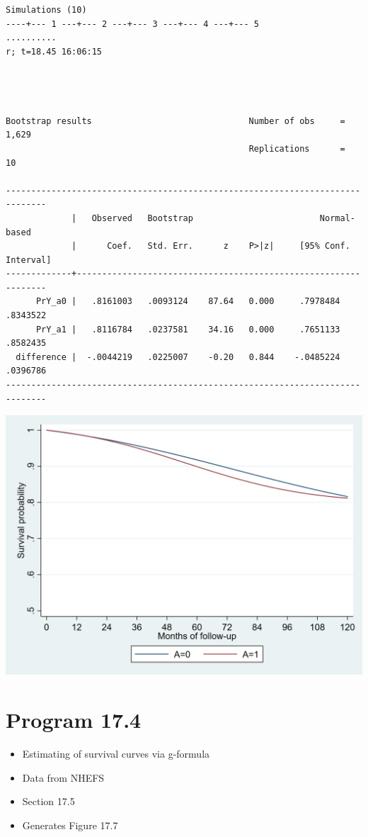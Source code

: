 \documentclass[
  10pt,
]{book}
\providecommand{\tightlist}{%
  \setlength{\itemsep}{0pt}\setlength{\parskip}{0pt}}
\begin{document}
\begin{verbatim}
Simulations (10)
----+--- 1 ---+--- 2 ---+--- 3 ---+--- 4 ---+--- 5 
..........
r; t=18.45 16:06:15




Bootstrap results                               Number of obs     =      1,629
                                                Replications      =         10

------------------------------------------------------------------------------
             |   Observed   Bootstrap                         Normal-based
             |      Coef.   Std. Err.      z    P>|z|     [95% Conf. Interval]
-------------+----------------------------------------------------------------
      PrY_a0 |   .8161003   .0093124    87.64   0.000     .7978484    .8343522
      PrY_a1 |   .8116784   .0237581    34.16   0.000     .7651133    .8582435
  difference |  -.0044219   .0225007    -0.20   0.844    -.0485224    .0396786
------------------------------------------------------------------------------
\end{verbatim}

\begin{center}\includegraphics[width=0.85\linewidth]{./figs/stata-fig-17-3} \end{center}

\hypertarget{program-17.4-1}{%
\section{Program 17.4}\label{program-17.4-1}}

\begin{itemize}
\tightlist
\item
  Estimating of survival curves via g-formula
\item
  Data from NHEFS
\item
  Section 17.5
\item
  Generates Figure 17.7
\end{itemize}
\end{document}
